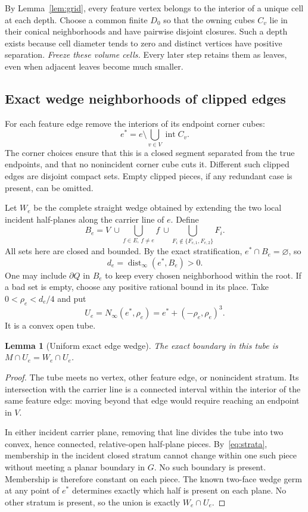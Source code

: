 \documentclass[11pt]{article}
\newtheorem{lemma}[theorem]{Lemma}
\theoremstyle{definition}
\theoremstyle{remark}
\newcommand{\intr}{\operatorname{int}}
\newcommand{\dist}{\operatorname{dist}}
\newcommand{\Ninf}[2]{N_\infty(#1,#2)}
\begin{document}
By Lemma~\ref{lem:grid}, every feature vertex belongs to the interior
of a unique cell at each depth. Choose a common finite $D_0$ so that
the owning cubes $C_v$ lie in their conical neighborhoods and have
pairwise disjoint closures. Such a depth exists because cell diameter
tends to zero and distinct vertices have positive separation.
\emph{Freeze these volume cells.} Every later step retains them as
leaves, even when adjacent leaves become much smaller.

\subsection{Exact wedge neighborhoods of clipped edges}
\label{sec:edges}

For each feature edge remove the interiors of its endpoint corner cubes:
\[
  e^*=e\setminus\bigcup_{v\in V}\intr C_v.
\]
The corner choices ensure that this is a closed segment separated from
the true endpoints, and that no nonincident corner cube cuts it.
Different such clipped edges are disjoint compact sets. Empty clipped
pieces, if any redundant case is present, can be omitted.

Let $W_e$ be the complete straight wedge obtained by extending the two
local incident half-planes along the carrier line of $e$. Define
\[
  B_e=V\ \cup\!\bigcup_{f\in E,\,f\ne e}f
    \ \cup\!\bigcup_{F_i\notin\{F_{e,1},F_{e,2}\}}F_i.
  \tag{7}\label{eq:edge-bad}
\]
All sets here are closed and bounded. By the exact stratification,
$e^*\cap B_e=\varnothing$, so
\[
  d_e=\dist_\infty(e^*,B_e)>0.
\]
One may include $\partial Q$ in $B_e$ to keep every chosen neighborhood
within the root. If a bad set is empty, choose any positive rational
bound in its place. Take $0<\rho_e<d_e/4$ and put
\[
  U_e=\Ninf{e^*}{\rho_e}
      =e^*+(-\rho_e,\rho_e)^3.
\]
It is a convex open tube.

\begin{lemma}[Uniform exact edge wedge]
\label{lem:edge-wedge}
The exact boundary in this tube is $M\cap U_e=W_e\cap U_e$.
\end{lemma}

\begin{proof}
The tube meets no vertex, other feature edge, or nonincident stratum.
Its intersection with the carrier line is a connected interval within
the interior of the same feature edge: moving beyond that edge would
require reaching an endpoint in $V$.

In either incident carrier plane, removing that line divides the tube
into two convex, hence connected, relative-open half-plane pieces.
By~\eqref{eq:strata}, membership in the incident closed stratum cannot
change within one such piece without meeting a planar boundary in
$G$. No such boundary is present. Membership is therefore constant
on each piece. The known two-face wedge germ at any point of $e^*$
determines exactly which half is present on each plane. No other
stratum is present, so the union is exactly $W_e\cap U_e$.
\end{proof}
\end{document}
